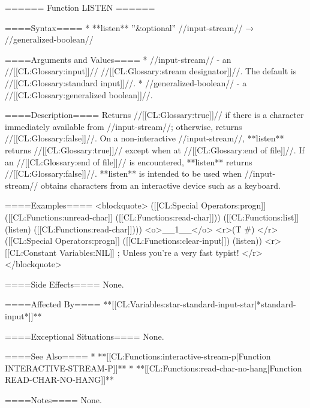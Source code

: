 ====== Function LISTEN ======

====Syntax====
  * **listen** ''&optional'' //input-stream// → //generalized-boolean//

====Arguments and Values====
  * //input-stream// - an //[[CL:Glossary:input]]// //[[CL:Glossary:stream designator]]//. The default is //[[CL:Glossary:standard input]]//.
  * //generalized-boolean// - a //[[CL:Glossary:generalized boolean]]//.

====Description====
Returns //[[CL:Glossary:true]]// if there is a character immediately available from //input-stream//; otherwise, returns //[[CL:Glossary:false]]//. On a non-interactive //input-stream//, **listen** returns //[[CL:Glossary:true]]// except when at //[[CL:Glossary:end of file]]//. If an //[[CL:Glossary:end of file]]// is encountered, **listen** returns //[[CL:Glossary:false]]//. **listen** is intended to be used when //input-stream// obtains characters from an interactive device such as a keyboard.

====Examples====
<blockquote> 
([[CL:Special Operators:progn]] 
  ([[CL:Functions:unread-char]] ([[CL:Functions:read-char]])) 
  ([[CL:Functions:list]] (listen) ([[CL:Functions:read-char]])))
<o>__1__</o>
 <r>(T #\1) </r>
([[CL:Special Operators:progn]] 
  ([[CL:Functions:clear-input]]) 
  (listen)) <r>[[CL:Constant Variables:NIL]] ; Unless you're a very fast typist! </r>
</blockquote>

====Side Effects====
None.

====Affected By====
**[[CL:Variables:star-standard-input-star|*standard-input*]]**

====Exceptional Situations====
None.

====See Also====
  * **[[CL:Functions:interactive-stream-p|Function INTERACTIVE-STREAM-P]]**
  * **[[CL:Functions:read-char-no-hang|Function READ-CHAR-NO-HANG]]**

====Notes====
None.


